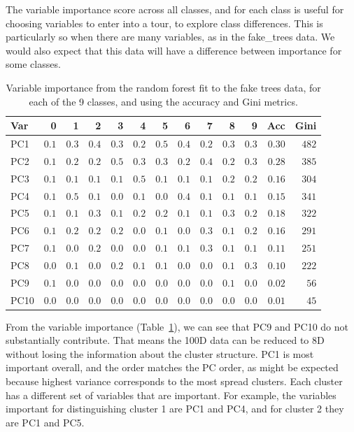\documentclass[
  letterpaper,
]{krantz}
\begin{document}

The variable importance score across all classes, and for each class is
useful for choosing variables to enter into a tour, to explore class
differences. This is particularly so when there are many variables, as
in the fake\_trees data. We would also expect that this data will have a
difference between importance for some classes.

\begin{longtable}{lrrrrrrrrrrrr}

\caption{\label{tbl-ft-importance}Variable importance from the random
forest fit to the fake trees data, for each of the 9 classes, and using
the accuracy and Gini metrics.}

\tabularnewline

\toprule
Var & 0 & 1 & 2 & 3 & 4 & 5 & 6 & 7 & 8 & 9 & Acc & Gini \\ 
\midrule\addlinespace[2.5pt]
PC1 & $0.1$ & $0.3$ & $0.4$ & $0.3$ & $0.2$ & $0.5$ & $0.4$ & $0.2$ & $0.3$ & $0.3$ & $0.30$ & $482$ \\ 
PC2 & $0.1$ & $0.2$ & $0.2$ & $0.5$ & $0.3$ & $0.3$ & $0.2$ & $0.4$ & $0.2$ & $0.3$ & $0.28$ & $385$ \\ 
PC3 & $0.1$ & $0.1$ & $0.1$ & $0.1$ & $0.5$ & $0.1$ & $0.1$ & $0.1$ & $0.2$ & $0.2$ & $0.16$ & $304$ \\ 
PC4 & $0.1$ & $0.5$ & $0.1$ & $0.0$ & $0.1$ & $0.0$ & $0.4$ & $0.1$ & $0.1$ & $0.1$ & $0.15$ & $341$ \\ 
PC5 & $0.1$ & $0.1$ & $0.3$ & $0.1$ & $0.2$ & $0.2$ & $0.1$ & $0.1$ & $0.3$ & $0.2$ & $0.18$ & $322$ \\ 
PC6 & $0.1$ & $0.2$ & $0.2$ & $0.2$ & $0.0$ & $0.1$ & $0.0$ & $0.3$ & $0.1$ & $0.2$ & $0.16$ & $291$ \\ 
PC7 & $0.1$ & $0.0$ & $0.2$ & $0.0$ & $0.0$ & $0.1$ & $0.1$ & $0.3$ & $0.1$ & $0.1$ & $0.11$ & $251$ \\ 
PC8 & $0.0$ & $0.1$ & $0.0$ & $0.2$ & $0.1$ & $0.1$ & $0.0$ & $0.0$ & $0.1$ & $0.3$ & $0.10$ & $222$ \\ 
PC9 & $0.1$ & $0.0$ & $0.0$ & $0.0$ & $0.0$ & $0.0$ & $0.0$ & $0.0$ & $0.1$ & $0.0$ & $0.02$ & $56$ \\ 
PC10 & $0.0$ & $0.0$ & $0.0$ & $0.0$ & $0.0$ & $0.0$ & $0.0$ & $0.0$ & $0.0$ & $0.0$ & $0.01$ & $45$ \\ 
\bottomrule

\end{longtable}

From the variable importance (Table~\ref{tbl-ft-importance}), we can see
that PC9 and PC10 do not substantially contribute. That means the 100D
data can be reduced to 8D without losing the information about the
cluster structure. PC1 is most important overall, and the order matches
the PC order, as might be expected because highest variance corresponds
to the most spread clusters. Each cluster has a different set of
variables that are important. For example, the variables important for
distinguishing cluster 1 are PC1 and PC4, and for cluster 2 they are PC1
and PC5.
\end{document}
